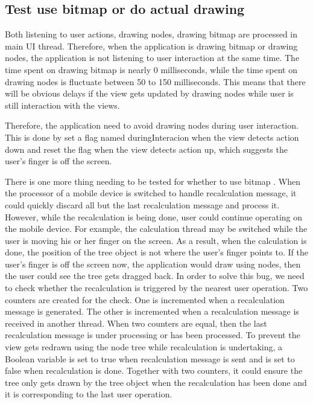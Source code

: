 \documentclass[a4paper,11pt,twoside]{report}
\begin{document}
\subsection{Test use bitmap or do actual drawing}

Both listening to user actions, drawing nodes, drawing bitmap are processed in main UI thread. Therefore, when the application is drawing bitmap or drawing nodes, the application is not listening to user interaction at the same time. The time spent on drawing bitmap is nearly 0 milliseconds, while the time spent on drawing nodes is fluctuate between 50 to 150 milliseconds. This means that there will be obvious delays if the view gets updated by drawing nodes while user is still interaction with the views.

Therefore, the application need to avoid drawing nodes during user interaction. This is done by set a flag named duringInteracion when  the view detects action down and reset the flag when the view detects action up, which suggests the user's finger is off the screen. 

There is one more thing needing to be tested for whether to use bitmap . When the processor of a mobile device is switched to handle recalculation message, it could quickly discard all but the last recalculation message and process it. However, while the recalculation is being done, user could continue operating on the mobile device. For example, the calculation thread may be switched while the user is moving his or her finger on the screen. As a result, when the calculation is done, the position of the tree object is not where the user's finger points to. If the user's finger is off the screen now, the application would draw using nodes, then the user could see the tree gets dragged back. In order to solve this bug, we need to check whether the recalculation is triggered by the nearest user operation. Two counters are created for the check. One is incremented when a recalculation message is generated. The other is incremented when a recalculation message is received in another thread. When two counters are equal, then the last recalculation message is under processing or has been processed. To prevent the view gets redrawn using the node tree while recalculation is undertaking, a Boolean variable is set to true when recalculation message is sent and is set to false when recalculation is done. Together with two counters, it could ensure the tree only gets drawn by the tree object when the recalculation has been done and it is corresponding to the last user operation. 
\end{document}
